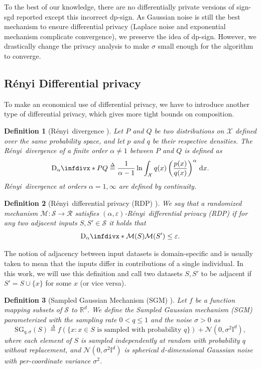 \documentclass[12pt]{article}
\newtheorem{definition}{Definition}
\newcommand{\eqdef}{\stackrel{\Delta}{=}}
\newcommand{\SG}{\mathrm{SG}}
\newcommand{\rdalpha}[2]{\mathrm{D}_{\alpha}\infdivx*{#1}{#2}}
\newcommand{\renyi}{R\'enyi}
\newcommand{\eps}{\varepsilon}
\begin{document}
To the best of our knowledge, there are no differentially private versions of sign-sgd reported except this incorrect dp-sign. As Gaussian noise is still the best mechanism to ensure differential privacy (Laplace noise and exponential mechanism complicate convergence), we preserve the idea of dp-sign. However, we drastically change the privacy analysis to make $\sigma$ small enough for the algorithm to converge.

\subsection{Rényi Differential privacy}
To make an economical use of differential privacy, we have to introduce another type of differential privacy, which gives more tight bounds on composition.
    \begin{definition}[\renyi\ divergence \cite{Mironov2017}] Let $P$ and $Q$ be two distributions on $\mathcal{X}$ defined over the same probability space, and let $p$ and $q$ be their respective densities. The \renyi\ divergence of a finite order $\alpha\neq 1$ between $P$ and $Q$ is defined as
    \[
    \rdalpha{P}{Q}\eqdef \frac1{\alpha-1}\ln \int_{\mathcal{X}} q(x)\left(\frac{p(x)}{q(x)}\right)^{\alpha}\,\mathrm{d}x.
    \]
    \renyi\ divergence at orders $\alpha=1,\infty$ are defined by continuity.
    \end{definition}
    
    
    \begin{definition}[\renyi\ differential privacy (RDP) \cite{Mironov2017}] We say that a randomized mechanism $\mathcal{M}\colon \mathcal{S}\to\mathcal{R}$ satisfies $(\alpha,\eps)$-\renyi\ differential privacy (RDP) if for any two \emph{adjacent} inputs $S,S'\in \mathcal{S}$ it holds that
    \[
    \rdalpha{\mathcal{M}(S)}{\mathcal{M}(S')}\leq \eps.
    \]
    \end{definition}

    The notion of adjacency between input datasets is domain-specific and is usually taken to mean that the inputs differ in contributions of a single individual. In this work, we will use this definition and call two datasets $S, S'$ to be adjacent if $S' = S \cup \{x\}$ for some $x$ (or vice versa).
    
    \begin{definition}[Sampled Gaussian Mechanism (SGM) \cite{mironov2019SGM}] Let $f$ be a function mapping subsets of $\mathcal{S}$ to $\mathbb{R}^d$. We define the Sampled Gaussian mechanism (SGM) parameterized with the sampling rate $0<q\leq 1$ and the noise $\sigma>0$ as
        \[
        \SG_{q,\sigma}(S)\eqdef f(\{x\colon x\in S \textrm{ is sampled with probability } q\})+\mathcal{N}(0,\sigma^2\mathbb{I}^d),
        \]
    where each element of $S$ is sampled independently at random with probability $q$ without replacement, and $\mathcal{N}(0,\sigma^2\mathbb{I}^d)$ is spherical $d$-dimensional Gaussian noise with per-coordinate variance $\sigma^2$.
    \end{definition}
    
\end{document}
